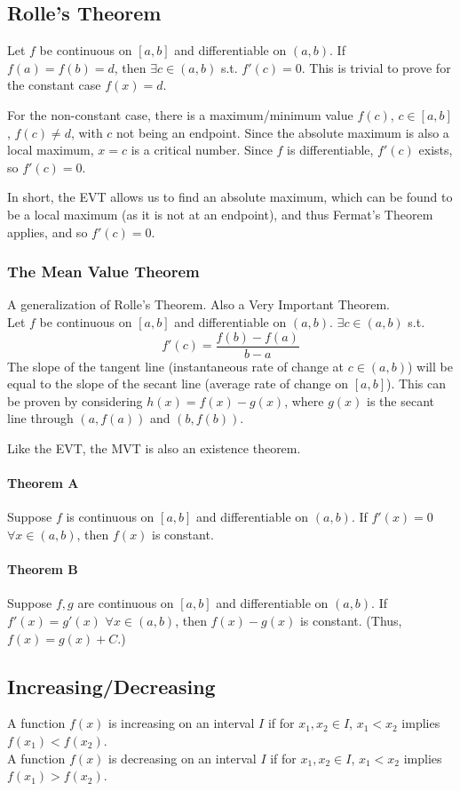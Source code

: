 \documentclass{article}
\begin{document}
\subsection{Rolle's Theorem}
Let $f$ be continuous on $[a,b]$ and differentiable on $(a,b)$. If $f(a)=f(b)=d$, then $\exists c \in (a,b)$ s.t. $f'(c) = 0$.
This is trivial to prove for the constant case $f(x)=d$.

For the non-constant case, there is a maximum/minimum value $f(c)$, $c\in[a,b]$, $f(c) \ne d$, with $c$ not being an endpoint. Since the absolute maximum is also a local maximum, $x=c$ is a critical number. Since $f$ is differentiable, $f'(c)$ exists, so $f'(c)=0$.

In short, the EVT allows us to find an absolute maximum, which can be found to be a local maximum (as it is not at an endpoint), and thus Fermat's Theorem applies, and so $f'(c)=0$.

\subsubsection{The Mean Value Theorem}\label{MVT} A generalization of Rolle's Theorem. Also a Very Important Theorem.\\
Let $f$ be continuous on $[a,b]$ and differentiable on $(a,b)$. $\exists c \in (a,b)$ s.t. $$f'(c) = \frac{f(b)-f(a)}{b-a}$$
The slope of the tangent line (instantaneous rate of change at $c\in(a,b)$) will be equal to the slope of the secant line (average rate of change on $[a,b]$).
This can be proven by considering $h(x) = f(x) - g(x)$, where $g(x)$ is the secant line through $(a,f(a))$ and $(b,f(b))$.

Like the EVT, the MVT is also an existence theorem.

\paragraph{Theorem A}
Suppose $f$ is continuous on $[a,b]$ and differentiable on $(a,b)$. If $f'(x)=0$ $\forall x\in(a,b)$, then $f(x)$ is constant.

\paragraph{Theorem B}
Suppose $f,g$ are continuous on $[a,b]$ and differentiable on $(a,b)$. If $f'(x)=g'(x)$ $\forall x\in(a,b)$, then $f(x) - g(x)$ is constant. (Thus, $f(x) = g(x) + C$.)

\subsection{Increasing/Decreasing}
A function $f(x)$ is increasing on an interval $I$ if for $x_1, x_2 \in I$, $x_1 < x_2$ implies $f(x_1) < f(x_2)$.\\
A function $f(x)$ is decreasing on an interval $I$ if for $x_1, x_2 \in I$, $x_1 < x_2$ implies $f(x_1) > f(x_2)$.
\end{document}
